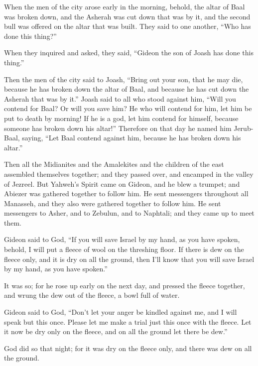 {\par }{\PP {}When the men of the city arose early in the morning, behold, the altar of Baal was broken down, and the Asherah was cut down that was by it, and the second bull was offered on the altar that was built.
They said to one another, “Who has done this thing?”
\par }{\PP When they inquired and asked, they said, “Gideon the son of Joash has done this thing.”
\par }{\PP {}Then the men of the city said to Joash, “Bring out your son, that he may die, because he has broken down the altar of Baal, and because he has cut down the Asherah that was by it.”
Joash said to all who stood against him, “Will you contend for Baal? Or will you save him? He who will contend for him, let him be put to death by morning! If he is a god, let him contend for himself, because someone has broken down his altar!”
Therefore on that day he named him Jerub-Baal, saying, “Let Baal contend against him, because he has broken down his altar.”
\par }{\PP {}Then all the Midianites and the Amalekites and the children of the east assembled themselves together; and they passed over, and encamped in the valley of Jezreel.
But Yahweh’s Spirit came on Gideon, and he blew a trumpet; and Abiezer was gathered together to follow him.
He sent messengers throughout all Manasseh, and they also were gathered together to follow him. He sent messengers to Asher, and to Zebulun, and to Naphtali; and they came up to meet them.
\par }{\PP {}Gideon said to God, “If you will save Israel by my hand, as you have spoken,
behold, I will put a fleece of wool on the threshing floor. If there is dew on the fleece only, and it is dry on all the ground, then I’ll know that you will save Israel by my hand, as you have spoken.”
\par }{\PP {}It was so; for he rose up early on the next day, and pressed the fleece together, and wrung the dew out of the fleece, a bowl full of water.
\par }{\PP {}Gideon said to God, “Don’t let your anger be kindled against me, and I will speak but this once. Please let me make a trial just this once with the fleece. Let it now be dry only on the fleece, and on all the ground let there be dew.”
\par }{\PP {}God did so that night; for it was dry on the fleece only, and there was dew on all the ground.

}
